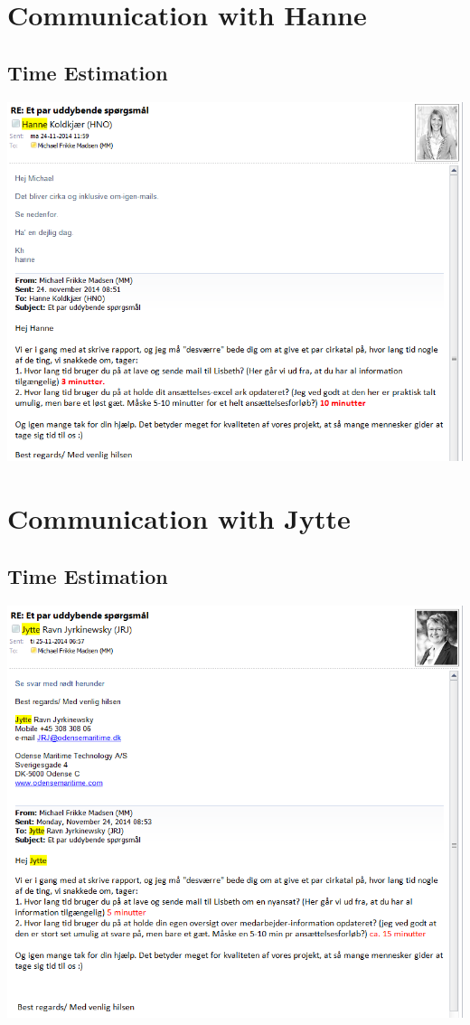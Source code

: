 \begin{linenumbers*}
\section{Communication with Hanne}

\subsection{Time Estimation}
\label{app:hanne_time_estimation}
\includegraphics[width=1.36\textwidth]{appendix/hanne_communication_1}


\section{Communication with Jytte}

\subsection{Time Estimation}
\label{app:jytte_time_estimation}
\includegraphics[width=1.36\textwidth]{appendix/jytte_communication_1}


\end{linenumbers*}
